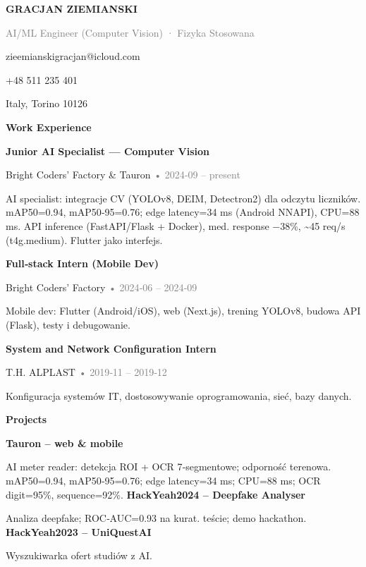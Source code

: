 \documentclass[11pt,a4paper]{article}
\newcommand{\sectiontitle}[1]{\vspace{2pt}\textbf{#1}\par\vspace{4pt}}
\begin{document}
\thispagestyle{empty}
{\Large\bfseries GRACJAN ZIEMIANSKI}\par
\textcolor{gray}{AI/ML Engineer (Computer Vision) · Fizyka Stosowana}\par
zieemianskigracjan@icloud.com\par +48 511 235 401\par Italy, Torino 10126\par
\vspace{8pt}
\begin{paracol}{2}
\sectiontitle{Work Experience}
\textbf{Junior AI Specialist — Computer Vision}\par\textcolor{accent}{Bright Coders' Factory \& Tauron} \textcolor{gray}{• 2024‑09 – present}\par AI specialist: integracje CV (YOLOv8, DEIM, Detectron2) dla odczytu liczników. mAP50=0.94, mAP50‑95=0.76; edge latency=34 ms (Android NNAPI), CPU=88 ms. API inference (FastAPI/Flask + Docker), med. response −38\%, \textasciitilde 45 req/s (t4g.medium). Flutter jako interfejs.\par\vspace{6pt}
\textbf{Full‑stack Intern (Mobile Dev)}\par\textcolor{accent}{Bright Coders' Factory} \textcolor{gray}{• 2024‑06 – 2024‑09}\par Mobile dev: Flutter (Android/iOS), web (Next.js), trening YOLOv8, budowa API (Flask), testy i debugowanie.\par\vspace{6pt}
\textbf{System and Network Configuration Intern}\par\textcolor{accent}{T.H. ALPLAST} \textcolor{gray}{• 2019‑11 – 2019‑12}\par Konfiguracja systemów IT, dostosowywanie oprogramowania, sieć, bazy danych.\par
\vspace{10pt}
\sectiontitle{Projects}
\textbf{Tauron – web \& mobile}\par AI meter reader: detekcja ROI + OCR 7‑segmentowe; odporność terenowa. mAP50=0.94, mAP50‑95=0.76; edge latency=34 ms; CPU=88 ms; OCR digit=95\%, sequence=92\%.\vspace{6pt}
\textbf{HackYeah2024 – Deepfake Analyser}\par Analiza deepfake; ROC‑AUC=0.93 na kurat. teście; demo hackathon.\vspace{6pt}
\textbf{HackYeah2023 – UniQuestAI}\par Wyszukiwarka ofert studiów z AI.


\end{paracol}
\end{document}
